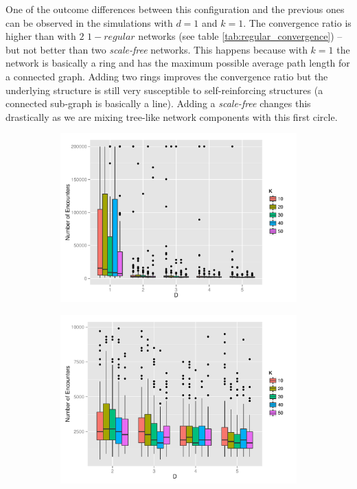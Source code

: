 \documentclass[preprint,number]{elsarticle}
\begin{document}
\noindent One of the outcome differences between this configuration and the previous ones can be observed in the simulations with $d=1$ and $k=1$. The convergence ratio is higher than with $2$ $1-regular$ networks (see table \ref{tab:regular_convergence}) --but not better than two \textit{scale-free} networks. This happens because with $k=1$ the network is basically a ring and has the maximum possible average path length for a connected graph. Adding two rings improves  the convergence ratio but the underlying structure is still very susceptible to self-reinforcing structures (a connected sub-graph is basically a line). Adding a \textit{scale-free} changes this drastically as we are mixing tree-like network components with this first circle.


\begin{figure}[H]
	\centering
	\begin{subfigure}{.49\linewidth}
		\centering
		\includegraphics[width=1\linewidth]{"../analysis/pdf/context_permeability_encounters_sfreg_k1020304050"}
		\caption{}
		\label{fig:ctx_perm_sfkreg_1020304050full}
	\end{subfigure}%
	\begin{subfigure}{.49\linewidth}
		\centering
		\includegraphics[width=1\linewidth]{"../analysis/pdf/context_permeability_encounters_sfreg_k1020304050_best"}

\end{subfigure}
\end{figure}
\end{document}

